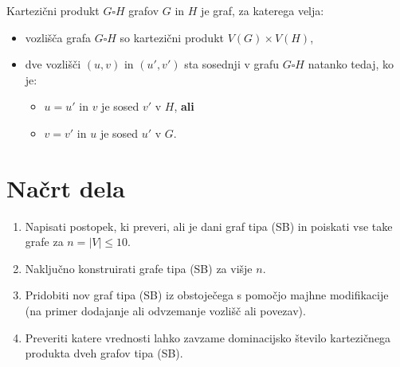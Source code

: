 \documentclass{article}
\begin{document}
\begin{definition}
    Kartezični produkt $G\square H$ grafov $G$ in $H$ je graf, za katerega velja:
    \begin{itemize}
        \item vozlišča grafa $G\square H$ so kartezični produkt $V(G)\times V(H)$,
        \item dve vozlišči $(u,v)$ in $(u',v')$ sta sosednji v grafu $G\square H$ natanko tedaj, ko je:
        \begin{itemize}
            \item $u=u'$ in $v$ je sosed $v'$ v $H$, \textbf{ali}
            \item $v=v'$ in $u$ je sosed $u'$ v $G$.
        \end{itemize}
    \end{itemize}
\end{definition}

\section{Načrt dela}

\begin{enumerate}
    \item Napisati postopek, ki preveri, ali je dani graf tipa (SB) in poiskati vse take grafe za $n = \lvert V \rvert \leq 10$.
    \item Naključno konstruirati grafe tipa (SB) za višje $n$.
    \item Pridobiti nov graf tipa (SB) iz obstoječega s pomočjo majhne modifikacije (na primer dodajanje ali odvzemanje vozlišč ali povezav).
    \item Preveriti katere vrednosti lahko zavzame dominacijsko število kartezičnega produkta dveh grafov tipa (SB).
\end{enumerate}
\end{document}
